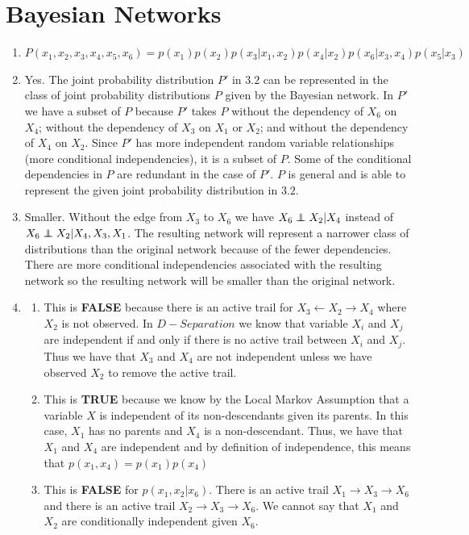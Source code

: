 \documentclass[english]{article}
\newcommand\independent{\protect\mathpalette{\protect\independenT}{\perp}}
\def\independenT#1#2{\mathrel{\rlap{$#1#2$}\mkern2mu{#1#2}}}
\begin{document}
\newpage
\section{Bayesian Networks}
\begin{enumerate}
    \item $P(x_1, x_2, x_3, x_4, x_5, x_6) = p(x_1)p(x_2)p(x_3 | x_1, x_2)p(x_4| x_2)p(x_6| x_3, x_4)p(x_5| x_3)$
    \item Yes. The joint probability distribution $P'$ in $3.2$ can be represented in the class of joint probability distributions $P$ given by the Bayesian network. In $P'$ we have a subset of $P$ because $P'$ takes $P$ without the dependency of $X_6$ on $X_4$; without the dependency of $X_3$ on $X_1$ or $X_2$; and without the dependency of $X_4$ on $X_2$. Since $P'$ has more independent random variable relationships (more conditional independencies), it is a subset of $P$. Some of the conditional dependencies in $P$ are redundant in the case of $P'$. $P$ is general and is able to represent the given joint probability distribution in $3.2$.
    \item Smaller. Without the edge from $X_3$ to $X_6$ we have $X_6 \independent X_2  | X_4$ instead of $X_6 \independent X_2  | X_4, X_3, X_1$. The resulting network will represent a  narrower class of distributions than the original network because of the fewer dependencies. There are more conditional independencies associated with the resulting network so the resulting network will be smaller than the original network. 
    \item \begin{enumerate}
    \item This is \textbf{FALSE} because there is an active trail for $X_3 \leftarrow X_2 \rightarrow X_4$ where $X_2$ is not observed. In $D-Separation$ we know that variable $X_i$ and $X_j$ are independent if and only if there is no active trail between $X_i$ and $X_j$. Thus we have that $X_3$ and $X_4$ are not independent unless we have observed $X_2$ to remove the active trail. 
    \item This is \textbf{TRUE} because we know by the Local Markov Assumption that a variable $X$ is independent of its non-descendants given its parents. In this case, $X_1$ has no parents and $X_4$ is a non-descendant. Thus, we have that $X_1$ and $X_4$ are independent and by definition of independence, this means that $p(x_1, x_4) = p(x_1)p(x_4)$
    \item This is \textbf{FALSE} for $p(x_1, x_2 | x_6)$. There is an active trail $X_1 \rightarrow X_3 \rightarrow X_6$ and there is an active trail $X_2 \rightarrow X_3 \rightarrow X_6$. We cannot say that $X_1$ and $X_2$ are conditionally independent given $X_6$. 

\end{enumerate}
\end{enumerate}
\end{document}

